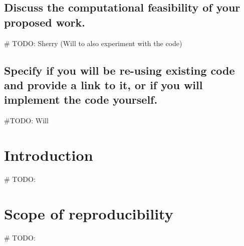 \documentclass[11pt,a4paper]{article}
\begin{document}
\subsection{Discuss the computational feasibility of your proposed work.}
\# TODO: Sherry (Will to also experiment with the code)

\subsection{Specify if you will be re-using existing code and provide
a link to it, or if you will implement the code yourself.}
\#TODO: Will

\section{Introduction}
\# TODO:

\section{Scope of reproducibility}
\# TODO:





\end{document}

